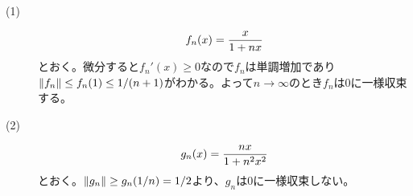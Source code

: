 \subsubsection{}%
\begin{sol} ${}$
  \begin{description}
    \item[(1)]
    \[
    f_n(x) = \frac{x}{1 + nx}
    \]
    とおく。微分すると$f_n'(x) \geq 0$なので$f_n$は単調増加であり$\left \lVert f_n \right \rVert \leq f_n(1) \leq 1/(n+1)$がわかる。よって$n \to \infty$のとき$f_n$は$0$に一様収束する。
    \item[(2)]
    \[
    g_n(x) = \frac{nx}{1 + n^2 x^2}
    \]
    とおく。$\left \lVert g_n \right \rVert \geq g_n(1/n) = 1/2$より、$g_n$は$0$に一様収束しない。
  \end{description}
\end{sol}
